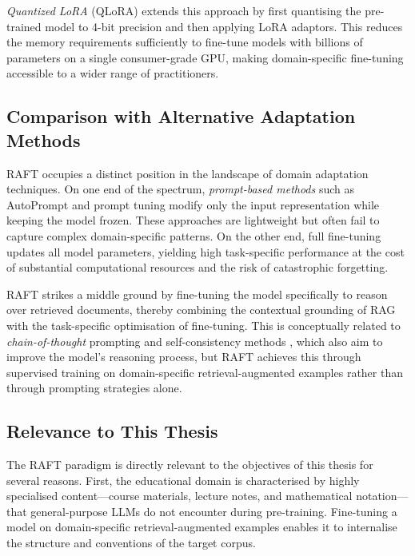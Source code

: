 \emph{Quantized LoRA} (QLoRA) \cite{dettmers2023qlora} extends this approach by first quantising the pre-trained model to 4-bit precision and then applying LoRA adaptors. This reduces the memory requirements sufficiently to fine-tune models with billions of parameters on a single consumer-grade GPU, making domain-specific fine-tuning accessible to a wider range of practitioners.

\subsection{Comparison with Alternative Adaptation Methods}

RAFT occupies a distinct position in the landscape of domain adaptation techniques. On one end of the spectrum, \emph{prompt-based methods} such as AutoPrompt \cite{shin2020autoprompt} and prompt tuning \cite{lester2021power} modify only the input representation while keeping the model frozen. These approaches are lightweight but often fail to capture complex domain-specific patterns. On the other end, full fine-tuning updates all model parameters, yielding high task-specific performance at the cost of substantial computational resources and the risk of catastrophic forgetting.

RAFT strikes a middle ground by fine-tuning the model specifically to reason over retrieved documents, thereby combining the contextual grounding of RAG with the task-specific optimisation of fine-tuning. This is conceptually related to \emph{chain-of-thought} prompting \cite{wei2022chain} and self-consistency methods \cite{wang2023selfconsistency}, which also aim to improve the model's reasoning process, but RAFT achieves this through supervised training on domain-specific retrieval-augmented examples rather than through prompting strategies alone.

\subsection{Relevance to This Thesis}

The RAFT paradigm is directly relevant to the objectives of this thesis for several reasons. First, the educational domain is characterised by highly specialised content---course materials, lecture notes, and mathematical notation---that general-purpose LLMs do not encounter during pre-training. Fine-tuning a model on domain-specific retrieval-augmented examples enables it to internalise the structure and conventions of the target corpus.

